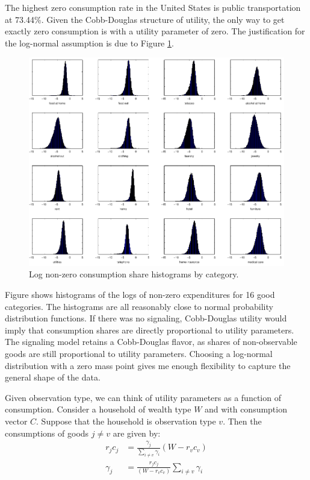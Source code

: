 \documentclass[12pt]{article}
\begin{document}
The highest zero consumption rate in the United States is public transportation at 73.44\%.  
Given the Cobb-Douglas structure of utility, the only way to get exactly zero consumption is with a utility parameter of zero.
The justification for the log-normal assumption is due to Figure \ref{fig:shrplot}.
\begin{figure}
	\begin{center}
		\includegraphics[scale=1]{pics/shrplot_cropped.pdf}
	\end{center}
	\caption{Log non-zero consumption share histograms by category.}
	\label{fig:shrplot}
\end{figure}
Figure  shows histograms of the logs of non-zero expenditures for 16 good categories.  
The histograms are all reasonably close to normal probability distribution functions.
If there was no signaling, Cobb-Douglas utility would imply that consumption shares are directly proportional to utility parameters.
The signaling model retains a Cobb-Douglas flavor, as shares of non-observable goods are still proportional to utility parameters.
Choosing a log-normal distribution with a zero mass point gives me enough flexibility to capture the general shape of the data.

Given observation type, we can think of utility parameters as a function of consumption.  Consider a household of wealth type $W$ and with consumption vector $C$.  
Suppose that the household is observation type $v$.
Then the consumptions of goods $j\neq v$ are given by:
\begin{align}
	\label{eq:sgd}
	r_jc_j &= \frac{\gamma_j}{\sum_{i\neq v}\gamma_i}  \left(W-  r_v c_v\right)\\
	\label{eq:sgdsol}
	\gamma_j &= \frac{r_j c_j}{\left(W- r_v c_v\right)} \sum_{i\neq v}\gamma_i  
\end{align}
\end{document}
